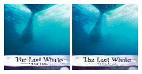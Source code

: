 \begin{figure}[h]
\begin{minipage}{0.15\textwidth}
    \end{minipage}
    \begin{minipage}{0.15\textwidth}
        \centering
        \includegraphics[width=\linewidth]{material/65k/2.png}
    \end{minipage}
    \begin{minipage}{0.15\textwidth}
        \centering
        \includegraphics[width=\linewidth]{material/262k/2.png}
    \end{minipage}


\end{figure}
